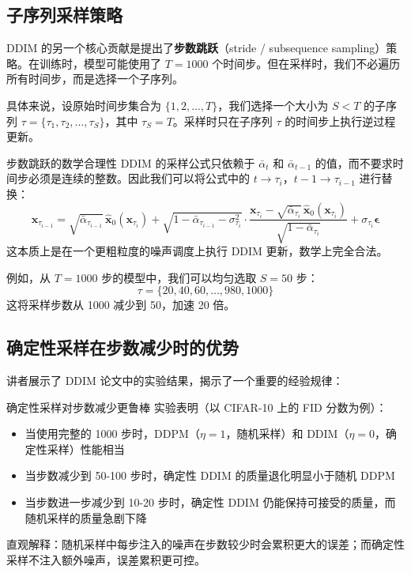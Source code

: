 \documentclass[a4paper]{article}
\begin{document}
\subsection{子序列采样策略}

DDIM 的另一个核心贡献是提出了\textbf{步数跳跃}（stride / subsequence sampling）策略。在训练时，模型可能使用了 $T=1000$ 个时间步。但在采样时，我们不必遍历所有时间步，而是选择一个子序列。

具体来说，设原始时间步集合为 $\{1, 2, \ldots, T\}$，我们选择一个大小为 $S < T$ 的子序列 $\tau = \{\tau_1, \tau_2, \ldots, \tau_S\}$，其中 $\tau_S = T$。采样时只在子序列 $\tau$ 的时间步上执行逆过程更新。

\begin{importantbox}{步数跳跃的数学合理性}
DDIM 的采样公式只依赖于 $\bar{\alpha}_t$ 和 $\bar{\alpha}_{t-1}$ 的值，而不要求时间步必须是连续的整数。因此我们可以将公式中的 $t \to \tau_i$，$t-1 \to \tau_{i-1}$ 进行替换：
$$
\mathbf{x}_{\tau_{i-1}} = \sqrt{\bar{\alpha}_{\tau_{i-1}}}\,\hat{\mathbf{x}}_0(\mathbf{x}_{\tau_i}) + \sqrt{1-\bar{\alpha}_{\tau_{i-1}}-\sigma_{\tau_i}^2}\cdot\frac{\mathbf{x}_{\tau_i} - \sqrt{\bar{\alpha}_{\tau_i}}\,\hat{\mathbf{x}}_0(\mathbf{x}_{\tau_i})}{\sqrt{1-\bar{\alpha}_{\tau_i}}} + \sigma_{\tau_i}\boldsymbol{\epsilon}
$$
这本质上是在一个更粗粒度的噪声调度上执行 DDIM 更新，数学上完全合法。
\end{importantbox}

例如，从 $T=1000$ 步的模型中，我们可以均匀选取 $S=50$ 步：
$$
\tau = \{20, 40, 60, \ldots, 980, 1000\}
$$
这将采样步数从 1000 减少到 50，加速 20 倍。

\subsection{确定性采样在步数减少时的优势}

讲者展示了 DDIM 论文中的实验结果，揭示了一个重要的经验规律：

\begin{importantbox}{确定性采样对步数减少更鲁棒}
实验表明（以 CIFAR-10 上的 FID 分数为例）：
\begin{itemize}
    \item 当使用完整的 1000 步时，DDPM（$\eta=1$，随机采样）和 DDIM（$\eta=0$，确定性采样）性能相当
    \item 当步数减少到 50-100 步时，确定性 DDIM 的质量退化明显小于随机 DDPM
    \item 当步数进一步减少到 10-20 步时，确定性 DDIM 仍能保持可接受的质量，而随机采样的质量急剧下降
\end{itemize}
直观解释：随机采样中每步注入的噪声在步数较少时会累积更大的误差；而确定性采样不注入额外噪声，误差累积更可控。
\end{importantbox}
\end{document}
